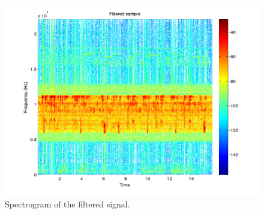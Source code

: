 \begin{figure}
  \begin{center}
    \hspace*{-1in}
    \includegraphics[width=180mm]{q1_filtered_spectrogram}
    \caption{Spectrogram of the filtered signal. 
      \label{fig:q1_filtered_spectrogram}}
  \end{center}  
\end{figure}
